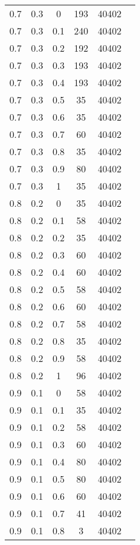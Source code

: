 \begin{table}
\begin{minipage}[!h]{0.50\hsize}
\begin{center}
{\begin{tabular}{c@{\hspace{5mm}}c@{\hspace{5mm}}c@{\hspace{5mm}}c@{\hspace{5mm}}c@{\hspace{5mm}}c}
				0.7     &0.3    &0      &193   &40402\\
				0.7     &0.3    &0.1    &240   &40402\\
				0.7     &0.3    &0.2    &192   &40402\\
				0.7     &0.3    &0.3    &193   &40402\\
				0.7     &0.3    &0.4    &193   &40402\\
				0.7     &0.3    &0.5    &35    &40402\\
				0.7     &0.3    &0.6    &35    &40402\\
				0.7     &0.3    &0.7    &60    &40402\\
				0.7     &0.3    &0.8    &35    &40402\\
				0.7     &0.3    &0.9    &80    &40402\\
				0.7     &0.3    &1      &35    &40402\\
				\midrule
				0.8     &0.2    &0      &35    &40402\\
				0.8     &0.2    &0.1    &58    &40402\\
				0.8     &0.2    &0.2    &35    &40402\\
				0.8     &0.2    &0.3    &60    &40402\\
				0.8     &0.2    &0.4    &60    &40402\\
				0.8     &0.2    &0.5    &58    &40402\\
				0.8     &0.2    &0.6    &60    &40402\\
				0.8     &0.2    &0.7    &58    &40402\\
				0.8     &0.2    &0.8    &35    &40402\\
				0.8     &0.2    &0.9    &58    &40402\\
				0.8     &0.2    &1      &96    &40402\\
				\midrule
				0.9     &0.1    &0      &58    &40402\\
				0.9     &0.1    &0.1    &35    &40402\\
				0.9     &0.1    &0.2    &58    &40402\\
				0.9     &0.1    &0.3    &60    &40402\\
				0.9     &0.1    &0.4    &80    &40402\\
				0.9     &0.1    &0.5    &80    &40402\\
				0.9     &0.1    &0.6    &60    &40402\\
				0.9     &0.1    &0.7    &41    &40402\\
				0.9     &0.1    &0.8    &3     &40402\\

\end{tabular}}
\end{center}
\end{minipage}
\end{table}
